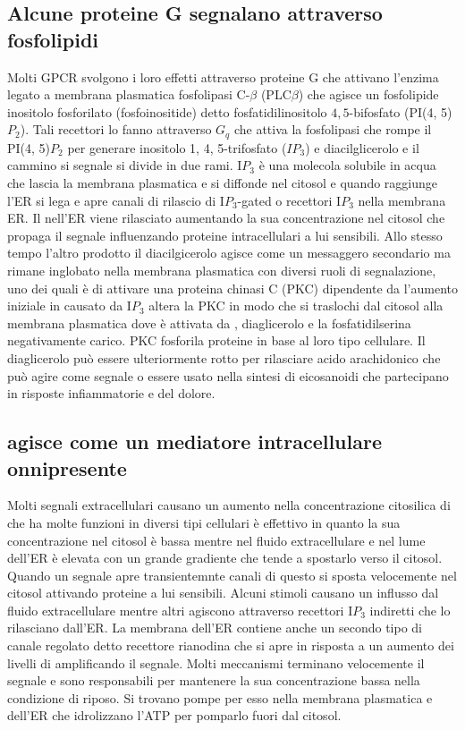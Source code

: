 \subsection{Alcune proteine G segnalano attraverso fosfolipidi}
Molti GPCR svolgono i loro effetti attraverso proteine G che attivano l'enzima legato a membrana plasmatica fosfolipasi C-$\beta$ (PLC$\beta$) che agisce un fosfolipide inositolo 
fosforilato (fosfoinositide) detto fosfatidilinositolo $4,5$-bifosfato (PI(4, 5)$P_2$). Tali recettori lo fanno attraverso $G_q$ che attiva la fosfolipasi che rompe il PI(4, 5)$P_2$
per generare inositolo 1, 4, 5-trifosfato ($IP_3$) e diacilglicerolo e il cammino si segnale si divide in due rami. I$P_3$ \`e una molecola solubile in acqua che lascia la membrana
plasmatica e si diffonde nel citosol e quando raggiunge l'ER si lega e apre canali di rilascio di  I$P_3$-gated o recettori I$P_3$ nella membrana ER. Il  nell'ER
viene rilasciato aumentando la sua concentrazione nel citosol che propaga il segnale influenzando proteine intracellulari a lui sensibili. Allo stesso tempo l'altro prodotto il 
diacilgicerolo agisce come un messaggero secondario ma rimane inglobato nella membrana plasmatica con diversi ruoli di segnalazione, uno dei quali \`e di attivare una proteina chinasi
C (PKC) dipendente da  l'aumento iniziale in  causato da I$P_3$ altera la PKC in modo che si traslochi dal citosol alla membrana plasmatica dove \`e attivata da
, diaglicerolo e la fosfatidilserina negativamente carico. PKC fosforila proteine in base al loro tipo cellulare. Il diaglicerolo pu\`o essere ulteriormente rotto 
per rilasciare acido arachidonico che pu\`o agire come segnale o essere usato nella sintesi di eicosanoidi che partecipano in risposte infiammatorie e del dolore. 
\subsection{ agisce come un mediatore intracellulare onnipresente}
Molti segnali extracellulari causano un aumento nella concentrazione citosilica di  che ha molte funzioni in diversi tipi cellulari \`e effettivo in quanto la sua 
concentrazione nel citosol \`e bassa mentre nel fluido extracellulare e nel lume dell'ER \`e elevata con un grande gradiente che tende a spostarlo verso il citosol. Quando un segnale
apre transientemnte canali di  questo si sposta velocemente nel citosol attivando proteine a lui sensibili. Alcuni stimoli causano un influsso dal fluido extracellulare 
mentre altri agiscono attraverso recettori I$P_3$ indiretti che lo rilasciano dall'ER. La membrana dell'ER contiene anche un secondo tipo di canale  regolato detto
recettore rianodina che si apre in risposta a un aumento dei livelli di  amplificando il segnale. Molti meccanismi terminano velocemente il segnale  e sono
responsabili per mantenere la sua concentrazione bassa nella condizione di riposo. Si trovano pompe per esso nella membrana plasmatica e dell'ER che idrolizzano l'ATP per pomparlo
fuori dal citosol. 

